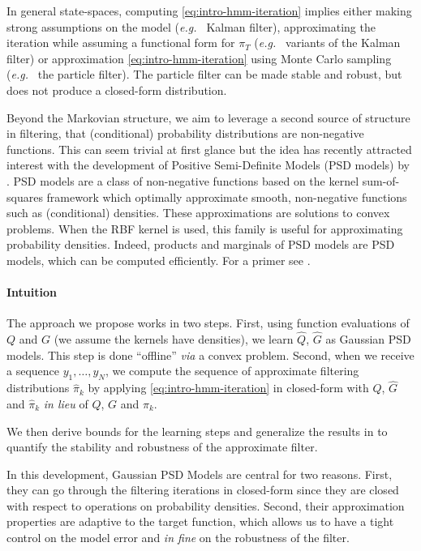 In general state-spaces, computing \cref{eq:intro-hmm-iteration} implies either making strong assumptions on the model (\emph{e.g.\ } Kalman filter), approximating the iteration while assuming a functional form for $\pi_T$ (\emph{e.g.\ } variants of the Kalman filter) or approximation \cref{eq:intro-hmm-iteration} using Monte Carlo sampling (\emph{e.g.\ } the particle filter). The particle filter can be made stable and robust, but does not produce a closed-form distribution.

Beyond the Markovian structure, we aim to leverage a second source of structure in filtering, that (conditional) probability distributions are non-negative functions. This can seem trivial at first glance but the idea has recently attracted interest with the development of Positive Semi-Definite Models (PSD models) by \citet{ulysse-non-negative}. PSD models are a class of non-negative functions based on the kernel sum-of-squares framework which optimally approximate smooth, non-negative functions such as (conditional) densities. These approximations are solutions to convex problems. When the RBF kernel is used, this family is useful for approximating probability densities. Indeed, products and marginals of PSD models are PSD models, which can be computed efficiently. For a primer see \citet{rudi2021psd,sampling-ulysse}.



\paragraph{Intuition}

The approach we propose works in two steps. First, using function evaluations of $Q$ and $G$ (we assume the kernels have densities), we learn $\hat Q$, $\hat G$ as Gaussian PSD models. This step is done ``offline'' \emph{via} a convex problem. Second, when we receive a sequence $y_1, \ldots, y_N$, we compute the sequence of approximate filtering distributions $\hat\pi_k$ by applying \cref{eq:intro-hmm-iteration} in closed-form with $\hat Q$, $\hat G$ and $\hat \pi_k$ \emph{in lieu} of $Q$, $G$ and $\pi_k$.

We then derive bounds for the learning steps and generalize the results in \cite{oudjane} to quantify the stability and robustness of the approximate filter.

In this development, Gaussian PSD Models are central for two reasons. First, they can go through the filtering iterations in closed-form since they are closed with respect to operations on probability densities. Second, their approximation properties are adaptive to the target function, which allows us to have a tight control on the model error and \emph{in fine} on the robustness of the filter.

